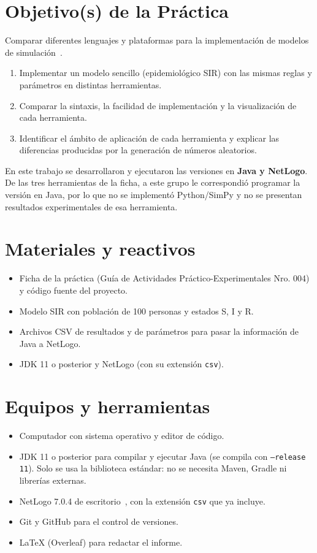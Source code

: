 \documentclass[11pt,a4paper]{article}
\begin{document}
\section{Objetivo(s) de la Práctica}
Comparar diferentes lenguajes y plataformas para la implementación de modelos de simulación~\cite{guia}.
\begin{enumerate}
  \item Implementar un modelo sencillo (epidemiológico SIR) con las mismas reglas y parámetros en distintas herramientas.
  \item Comparar la sintaxis, la facilidad de implementación y la visualización de cada herramienta.
  \item Identificar el ámbito de aplicación de cada herramienta y explicar las diferencias producidas por la generación de números aleatorios.
\end{enumerate}
En este trabajo se desarrollaron y ejecutaron las versiones en \textbf{Java y NetLogo}. De las tres herramientas de la ficha, a este grupo le correspondió programar la versión en Java, por lo que no se implementó Python/SimPy y no se presentan resultados experimentales de esa herramienta.

\section{Materiales y reactivos}
\begin{itemize}
  \item Ficha de la práctica (Guía de Actividades Práctico-Experimentales Nro. 004) y código fuente del proyecto.
  \item Modelo SIR con población de 100 personas y estados S, I y R.
  \item Archivos CSV de resultados y de parámetros para pasar la información de Java a NetLogo.
  \item JDK 11 o posterior y NetLogo (con su extensión \texttt{csv}).
\end{itemize}

\section{Equipos y herramientas}
\begin{itemize}
  \item Computador con sistema operativo y editor de código.
  \item JDK 11 o posterior para compilar y ejecutar Java (se compila con \texttt{--release 11}). Solo se usa la biblioteca estándar: no se necesita Maven, Gradle ni librerías externas.
  \item NetLogo 7.0.4 de escritorio~\cite{netlogo}, con la extensión \texttt{csv} que ya incluye.
  \item Git y GitHub para el control de versiones.
  \item \LaTeX{} (Overleaf) para redactar el informe.
\end{itemize}
\end{document}
